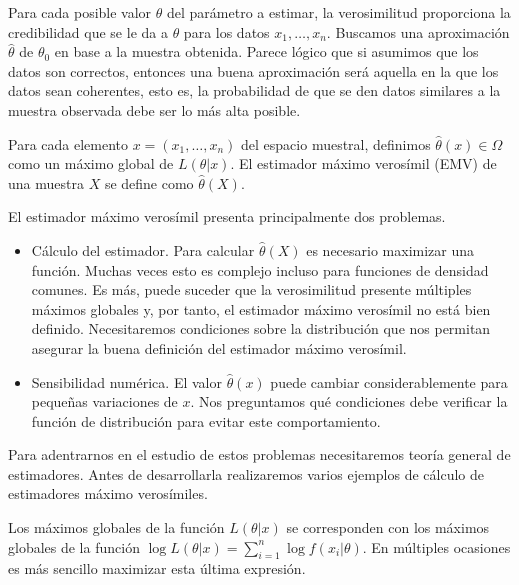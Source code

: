\documentclass{article}
\begin{document}
    Para cada posible valor $\theta$ del parámetro a estimar, la verosimilitud proporciona la credibilidad que se le da a $\theta$ para los datos $x_1, \ldots, x_n$. Buscamos una aproximación $\hat{\theta}$ de $\theta_0$ en base a la muestra obtenida. Parece lógico que si asumimos que los datos son correctos, entonces una buena aproximación será aquella en la que los datos sean coherentes, esto es, la probabilidad de que se den datos similares a la muestra observada debe ser lo más alta posible.

    \begin{definition}
        Para cada elemento $x = (x_1, \ldots, x_n)$ del espacio muestral, definimos $\hat{\theta}(x) \in \Omega$ como un máximo global de $L(\theta | x)$. El estimador máximo verosímil (EMV) de una muestra $X$ se define como $\hat{\theta}(X)$.
    \end{definition}

    El estimador máximo verosímil presenta principalmente dos problemas.
    \begin{itemize}
        \item Cálculo del estimador. Para calcular $\hat{\theta}(X)$ es necesario maximizar una función. Muchas veces esto es complejo incluso para funciones de densidad comunes. Es más, puede suceder que la verosimilitud presente múltiples máximos globales y, por tanto, el estimador máximo verosímil no está bien definido. Necesitaremos condiciones sobre la distribución que nos permitan asegurar la buena definición del estimador máximo verosímil.
        \item Sensibilidad numérica. El valor $\hat{\theta}(x)$ puede cambiar considerablemente para pequeñas variaciones de $x$. Nos preguntamos qué condiciones debe verificar la función de distribución para evitar este comportamiento.
    \end{itemize}

    Para adentrarnos en el estudio de estos problemas necesitaremos teoría general de estimadores. Antes de desarrollarla realizaremos varios ejemplos de cálculo de estimadores máximo verosímiles.

    \begin{remark} \label{rem:emv:log}
        Los máximos globales de la función $L(\theta | x)$ se corresponden con los máximos globales de la función $\log L(\theta | x) = \sum_{i = 1}^n \log f(x_i | \theta)$. En múltiples ocasiones es más sencillo maximizar esta última expresión.
    \end{remark}
\end{document}
